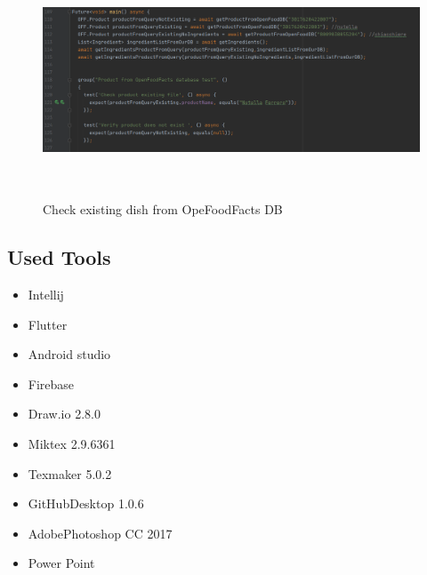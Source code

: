 \documentclass [12pt]{article}
\begin{document}
\begin{itemize}[•]
\begin{figure}[h!]
\medskip
\small
\end{figure}
\begin{figure}[h!]
\centering
\includegraphics[width=\linewidth,height=7cm]{existingTestDishFromOpenFoodFacts.PNG}
\caption{Check existing dish from OpeFoodFacts DB}
\medskip
\small
\end{figure}

\end{itemize}
\clearpage
\subsection{Used Tools}
\begin{itemize}
\item Intellij
\item Flutter
\item Android studio
\item Firebase
\item Draw.io 2.8.0
\item Miktex 2.9.6361
\item Texmaker 5.0.2
\item GitHubDesktop 1.0.6
\item AdobePhotoshop CC 2017
\item Power Point

\end{itemize}
\end{document}
